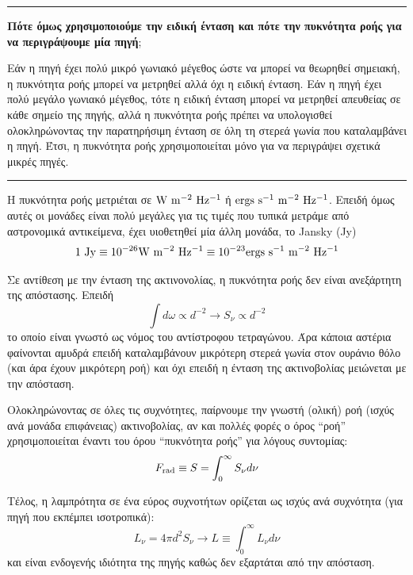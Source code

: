 {\color{red} \hrule}
\textbf{Πότε όμως χρησιμοποιούμε την ειδική ένταση και πότε την πυκνότητα ροής για να περιγράψουμε μία πηγή};

Εάν η πηγή έχει πολύ μικρό γωνιακό μέγεθος ώστε να μπορεί να θεωρηθεί σημειακή, η πυκνότητα ροής μπορεί να μετρηθεί αλλά όχι η ειδική ένταση.
Εάν η πηγή έχει πολύ μεγάλο γωνιακό μέγεθος, τότε η ειδική ένταση μπορεί να μετρηθεί απευθείας σε κάθε σημείο της πηγής, αλλά η πυκνότητα ροής πρέπει να υπολογισθεί ολοκληρώνοντας την παρατηρήσιμη ένταση σε όλη τη στερεά γωνία που καταλαμβάνει η πηγή. Έτσι, η πυκνότητα ροής χρησιμοποιείται μόνο για να περιγράψει σχετικά μικρές πηγές.\\
{\color{red} \hrule}

Η πυκνότητα ροής μετριέται σε $\rm W \ m^{-2} \ Hz^{-1}$ ή $\rm ergs \ s^{-1} \ m^{-2} \ Hz^{-1}$. Επειδή όμως αυτές οι μονάδες είναι πολύ μεγάλες για τις τιμές που τυπικά μετράμε από αστρονομικά αντικείμενα, έχει υιοθετηθεί μία άλλη μονάδα, το Jansky (Jy) 
$$\rm 1 \ Jy \equiv 10^{-26} W \ m^{-2} \ Hz^{-1} \equiv 10^{-23} ergs \ s^{-1} \ m^{-2} \ Hz^{-1}$$

Σε αντίθεση με την ένταση της ακτινονολίας, η πυκνότητα ροής δεν είναι ανεξάρτητη της απόστασης. Επειδή $$\int d\omega \propto d^{-2} \longrightarrow S_{\nu} \propto d^{-2}$$ το οποίο είναι γνωστό ως νόμος του αντίστροφου τετραγώνου. Άρα κάποια αστέρια φαίνονται αμυδρά επειδή καταλαμβάνουν μικρότερη στερεά γωνία στον ουράνιο θόλο (και άρα έχουν μικρότερη ροή) και όχι επειδή η ένταση της ακτινοβολίας μειώνεται με την απόσταση.

Ολοκληρώνοντας σε όλες τις συχνότητες, παίρνουμε την γνωστή (ολική) ροή (ισχύς ανά μονάδα επιφάνειας) ακτινοβολίας, αν και πολλές φορές ο όρος ``ροή'' χρησιμοποιείται έναντι του όρου ``πυκνότητα ροής'' για λόγους συντομίας:
\begin{equation}
    F_{\rm rad} \equiv S = \int_{0}^{\infty} S_{\nu} d\nu
\end{equation}

Τέλος, η λαμπρότητα σε ένα εύρος συχνοτήτων ορίζεται ως ισχύς ανά συχνότητα
(για πηγή που εκπέμπει ισοτροπικά):
\begin{equation}
    L_{\nu} = 4\pi d^2 S_{\nu} \longrightarrow L \equiv \int_{0}^{\infty} L_{\nu} d\nu
\end{equation}
και είναι ενδογενής ιδιότητα της πηγής καθώς δεν εξαρτάται από την απόσταση.




